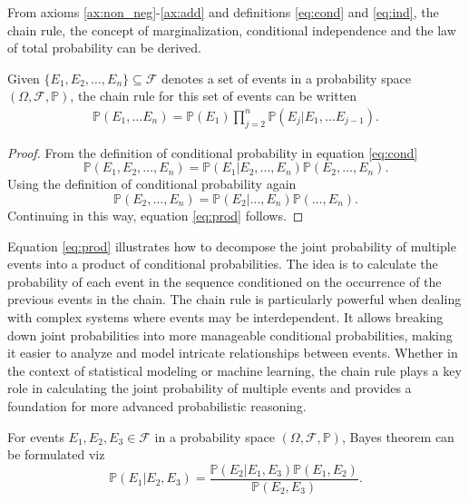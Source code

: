 From axioms \ref{ax:non_neg}-\ref{ax:add} and definitions \ref{eq:cond} and \ref{eq:ind}, the chain rule, the concept of marginalization, conditional independence and the law of total probability can be derived. 
\begin{theorem}
	\label{theorem:chain_rule}
	Given $\{E_1, E_2, \ldots, E_n\}\subseteq \mathcal{F}$ denotes a set of events in a probability space $(\Omega, \mathcal{F}, \mathbb{P})$, the chain rule for this set of events can be written
	\begin{equation}
		\begin{split}
			\mathbb{P}(E_1, \dots E_n) = \mathbb{P}(E_1)\prod_{j=2}^{n}\mathbb{P}(E_j|E_1,\dots E_{j-1}).
		\end{split}
		\label{eq:prod}
	\end{equation}
\end{theorem}
\begin{proof}
	From the definition of conditional probability in equation \eqref{eq:cond}
	\begin{equation}
		\mathbb{P}(E_1, E_2, \ldots, E_n) = \mathbb{P}(E_1|E_2, \dots, E_n)\mathbb{P}(E_2, \dots, E_n).
		\label{eq:p1}
	\end{equation}
	Using the definition of conditional probability again
	\begin{equation}
		\mathbb{P}(E_2, \ldots, E_n) = \mathbb{P}(E_2| \ldots, E_n)\mathbb{P}(\dots, E_n).
	\end{equation}
	Continuing in this way, equation \eqref{eq:prod} follows.
\end{proof}
Equation \eqref{eq:prod} illustrates how to decompose the joint probability of multiple events into a product of conditional probabilities. The idea is to calculate the probability of each event in the sequence conditioned on the occurrence of the previous events in the chain. The chain rule is particularly powerful when dealing with complex systems where events may be interdependent. It allows breaking down joint probabilities into more manageable conditional probabilities, making it easier to analyze and model intricate relationships between events. Whether in the context of statistical modeling or machine learning, the chain rule plays a key role in calculating the joint probability of multiple events and provides a foundation for more advanced probabilistic reasoning.

\begin{theorem}
	\label{theorem:bayes_theorem}
	For events $E_1,E_2,E_3 \in \mathcal{F}$ in a probability space $(\Omega, \mathcal{F}, \mathbb{P})$, Bayes theorem can be formulated viz
	\begin{equation}
		\mathbb{P}(E_1| E_2,E_3) = \frac{\mathbb{P}(E_2| E_1,E_3)\mathbb{P}(E_1,E_2)}{\mathbb{P}(E_2,E_3)}.
		\label{bayes_theorem}
	\end{equation}
\end{theorem}


